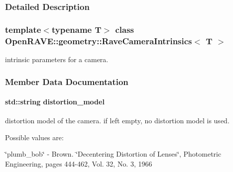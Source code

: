 \subsubsection{Detailed Description}
\subsubsection*{template$<$typename T$>$ class OpenRAVE::geometry::RaveCameraIntrinsics$<$ T $>$}

intrinsic parameters for a camera. 

\subsubsection{Member Data Documentation}
\hypertarget{classOpenRAVE_1_1geometry_1_1RaveCameraIntrinsics_ac689303f406328d3c603051e11b482bf}{
\paragraph[{distortion\_\-model}]{\setlength{\rightskip}{0pt plus 5cm}std::string {\bf distortion\_\-model}}\hfill}
\label{classOpenRAVE_1_1geometry_1_1RaveCameraIntrinsics_ac689303f406328d3c603051e11b482bf}


distortion model of the camera. if left empty, no distortion model is used. 

Possible values are:
\begin{DoxyItemize}
\item \char`\"{}plumb\_\-bob\char`\"{} -\/ Brown. \char`\"{}Decentering Distortion of Lenses\char`\"{}, Photometric Engineering, pages 444-\/462, Vol. 32, No. 3, 1966 
\end{DoxyItemize}